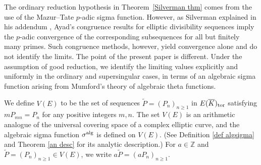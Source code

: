 \documentclass[11pt]{amsart}
\theoremstyle{definition}
\newcommand{\Z}{\mathbb{Z}}
\begin{document}
The ordinary reduction hypothesis in Theorem~\ref{Silverman thm} comes from the
use of the Mazur--Tate $p$-adic sigma function. 
However, as Silverman explained in his addendum \cite{Si05b}, Ayad's
congruence results for elliptic divisibility sequences imply the $p$-adic
convergence of the corresponding subsequences for all but finitely many
primes.
Such congruence methods, however, yield convergence alone and do not identify the limits.
 The point of the present paper is different. Under the assumption of good reduction, we identify the limiting values explicitly and uniformly in the ordinary and supersingular cases, in terms of an algebraic sigma function arising from Mumford's theory of algebraic theta functions.



We define $V(E)$ to be the set of sequences $\widetilde{P}=(P_n)_{n \geq 1}$ in $E(\overline{K})_{\rm tor}$ satisfying $mP_{mn}=P_n$ for any positive integers $m, n$. 
The set $V(E)$ is an arithmetic analogue of the universal covering space of a complex elliptic curve, and the algebraic sigma function $\sigma^{\rm alg}$ is defined on $V(E)$. (See Definition \ref{def algsigma} and Theorem \ref{an desc} for its analytic description.) For $a \in \Z$ and $\widetilde{P}=(P_n)_{n \geq 1} \in V(E)$, we write $a \widetilde{P}=(aP_n)_{n \geq 1}$.
\end{document}
